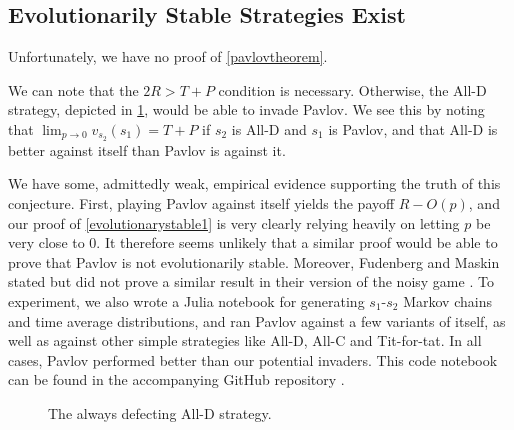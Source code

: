 \documentclass[12pt]{article}
\theoremstyle{definition}
\theoremstyle{remark}
\begin{document}



    \subsection{Evolutionarily Stable Strategies Exist}

    Unfortunately, we have no proof of \cref{pavlovtheorem}.

    We can note that the $2R > T + P$ condition is necessary. Otherwise, the All-D strategy, depicted in \cref{figurealld}, would be able to invade Pavlov. We see this by noting that $\lim_{p \to 0} v_{s_2}(s_1) = T + P$ if $s_2$ is All-D and $s_1$ is Pavlov, and that All-D is better against itself than Pavlov is against it.

    We have some, admittedly weak, empirical evidence supporting the truth of this conjecture. First, playing Pavlov against itself yields the payoff $R - O(p)$, and our proof of \cref{evolutionarystable1} is very clearly relying heavily on letting $p$ be very close to 0. It therefore seems unlikely that a similar proof would be able to prove that Pavlov is not evolutionarily stable. Moreover, Fudenberg and Maskin stated but did not prove a similar result in their version of the noisy game \cite{fundenberg1990evolution}. To experiment, we also wrote a Julia notebook for generating $s_1$-$s_2$ Markov chains and time average distributions, and ran Pavlov against a few variants of itself, as well as against other simple strategies like All-D, All-C and Tit-for-tat. In all cases, Pavlov performed better than our potential invaders. This code notebook can be found in the accompanying GitHub repository \cite{arvid2020}.

\begin{figure}
  \centering
  \caption{The always defecting All-D strategy.}
  \label{figurealld}
\end{figure}
\end{document}
